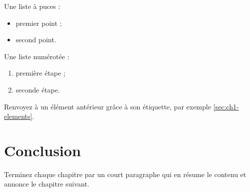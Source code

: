 Une liste à puces :
\begin{itemize}[leftmargin=1.5cm]
  \item premier point ;
  \item second point.
\end{itemize}

Une liste numérotée :
\begin{enumerate}[leftmargin=1.5cm]
  \item première étape ;
  \item seconde étape.
\end{enumerate}

Renvoyez à un élément antérieur grâce à son étiquette, par exemple
\autoref{sec:ch1-elements}.

\section*{Conclusion}

Terminez chaque chapitre par un court paragraphe qui en résume le contenu et
annonce le chapitre suivant.

\newpage
